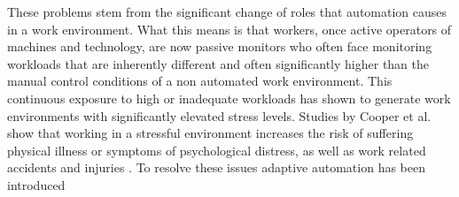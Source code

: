 These problems stem from the significant change of roles that automation causes in a work environment. What this means is that workers, once active operators of machines and technology, are now passive monitors who often face monitoring workloads that are inherently different and often significantly higher than the manual control conditions of a non automated work environment. This continuous exposure to high or inadequate workloads has shown to generate work environments with significantly elevated stress levels. Studies by Cooper et al. show that working in a stressful environment increases the risk of suffering physical illness or symptoms of psychological distress, as well as work related accidents and injuries \cite{Clarke2004}.
To resolve these issues adaptive automation has been introduced


%
%




